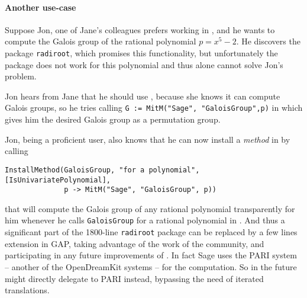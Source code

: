 \paragraph{Another use-case}

Suppose Jon, one of Jane's colleagues prefers working in \GAP, and he wants to
compute the Galois group of the rational polynomial $p = x^5 - 2$. He discovers
the \GAP package \texttt{radiroot}, which promises this functionality, but
unfortunately the package does not work for this polynomial and thus \GAP alone
cannot solve Jon's problem.

Jon hears from Jane that he should use \Sage, because she knows it can compute Galois groups, so he tries calling \lstinline|G := MitM("Sage", "GaloisGroup",p)| in \GAP which gives him the desired Galois group as a \GAP permutation group.

Jon, being a proficient \GAP user, also knows that he can now install a \emph{method} in \GAP by calling 
\begin{lstlisting}
InstallMethod(GaloisGroup, "for a polynomial", [IsUnivariatePolynomial], 
              p -> MitM("Sage", "GaloisGroup", p))
\end{lstlisting}
that will compute the Galois group of any rational polynomial transparently for him whenever he calls \lstinline|GaloisGroup| for a rational polynomial in \GAP. 
And thus a significant part of the 1800-line \lstinline|radiroot| package can be replaced by a few lines extension in GAP, taking advantage of the work of the \Sage community, and participating in any future improvements of \Sage. 
In fact Sage uses the PARI system -- another of the OpenDreamKit systems -- for the computation.  So in the future \GAP might directly delegate to PARI instead, bypassing the need of iterated translations.



